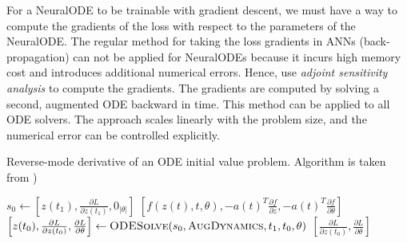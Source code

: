 For a \gls{NeuralODE} to be trainable with gradient descent, we must have a way to compute the gradients of the loss with respect to the parameters of the \gls{NeuralODE}.
The regular method for taking the loss gradients in \glspl{ANN} (back-propagation) can not be applied for \glspl{NeuralODE} because it incurs high memory cost and introduces additional numerical errors.
Hence, \citeauthor{chenNeuralOrdinaryDifferential2019} \cite{chenNeuralOrdinaryDifferential2019} use \textit{adjoint sensitivity analysis} to compute the gradients.
The gradients are computed by solving a second, augmented \gls{ODE} backward in time.
This method can be applied to all \gls{ODE} solvers.
The approach scales linearly with the problem size, and the numerical error can be controlled explicitly.

\begin{algorithm}[h]
    \caption{Reverse-mode derivative of an ODE initial value problem. Algorithm is taken from \citeauthor{chenNeuralOrdinaryDifferential2019} \cite{chenNeuralOrdinaryDifferential2019})}
    \label{alg:neural-ode-reverse-mode-diff}
    \begin{algorithmic}
            \State $s_0 \gets \left[z(t_1), \frac{\partial L}{\partial z(t_1)}, 0_{|\theta|}\right]$
                \State \Return $\left[f(z(t), t, \theta), -a(t)^T\frac{\partial f}{\partial z}, -a(t)^T\frac{\partial f}{\partial \theta}\right]$
            \EndFunction
            \State $\left[z(t_0), \frac{\partial L}{\partial z(t_0)}, \frac{\partial L}{\partial \theta}\right] \gets \Call{ODESolve}{s_0, \textproc{AugDynamics}, t_1, t_0, \theta}$
            \State \Return $\left[\frac{\partial L}{\partial z(t_0)}, \frac{\partial L}{\partial \theta}\right]$
        \EndFunction
    \end{algorithmic}
\end{algorithm}

